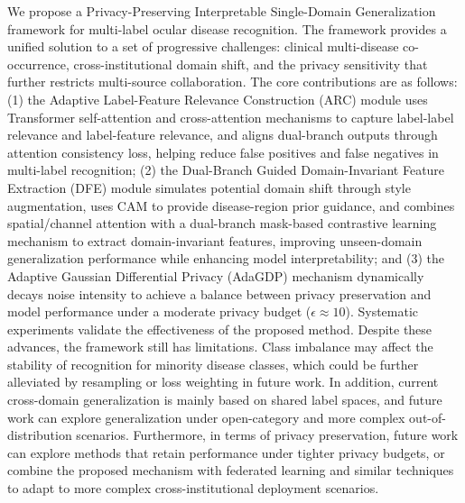 We propose a Privacy-Preserving Interpretable Single-Domain Generalization framework for multi-label ocular disease recognition. The framework provides a unified solution to a set of progressive challenges: clinical multi-disease co-occurrence, cross-institutional domain shift, and the privacy sensitivity that further restricts multi-source collaboration. The core contributions are as follows: (1) the Adaptive Label-Feature Relevance Construction (ARC) module uses Transformer self-attention and cross-attention mechanisms to capture label-label relevance and label-feature relevance, and aligns dual-branch outputs through attention consistency loss, helping reduce false positives and false negatives in multi-label recognition; (2) the Dual-Branch Guided Domain-Invariant Feature Extraction (DFE) module simulates potential domain shift through style augmentation, uses CAM to provide disease-region prior guidance, and combines spatial/channel attention with a dual-branch mask-based contrastive learning mechanism to extract domain-invariant features, improving unseen-domain generalization performance while enhancing model interpretability; and (3) the Adaptive Gaussian Differential Privacy (AdaGDP) mechanism dynamically decays noise intensity to achieve a balance between privacy preservation and model performance under a moderate privacy budget (\(\epsilon \approx 10\)). Systematic experiments validate the effectiveness of the proposed method. Despite these advances, the framework still has limitations. Class imbalance may affect the stability of recognition for minority disease classes, which could be further alleviated by resampling or loss weighting in future work. In addition, current cross-domain generalization is mainly based on shared label spaces, and future work can explore generalization under open-category and more complex out-of-distribution scenarios. Furthermore, in terms of privacy preservation, future work can explore methods that retain performance under tighter privacy budgets, or combine the proposed mechanism with federated learning and similar techniques to adapt to more complex cross-institutional deployment scenarios.
